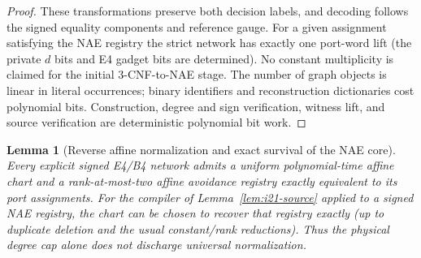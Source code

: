 \documentclass[11pt]{article}
\newtheorem{lemma}[theorem]{Lemma}
\begin{document}
\begin{proof}
These transformations preserve both decision labels, and decoding follows the signed equality components and reference gauge. For a given assignment satisfying the NAE registry the strict network has exactly one port-word lift (the private $d$ bits and E4 gadget bits are determined). No constant multiplicity is claimed for the initial 3-CNF-to-NAE stage. The number of graph objects is linear in literal occurrences; binary identifiers and reconstruction dictionaries cost polynomial bits. Construction, degree and sign verification, witness lift, and source verification are deterministic polynomial bit work.
\end{proof}

\begin{lemma}[Reverse affine normalization and exact survival of the NAE core]\label{lem:i21-reverse}
Every explicit signed E4/B4 network admits a uniform polynomial-time affine chart and a rank-at-most-two affine avoidance registry exactly equivalent to its port assignments. For the compiler of Lemma~\ref{lem:i21-source} applied to a signed NAE registry, the chart can be chosen to recover that registry exactly (up to duplicate deletion and the usual constant/rank reductions). Thus the physical degree cap alone does not discharge universal normalization.
\end{lemma}
\end{document}
